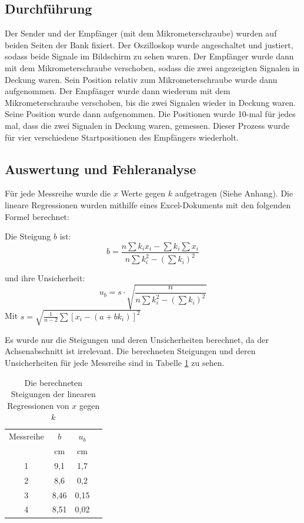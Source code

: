 \documentclass[11pt,a4paper]{article}
\begin{document}
\subsection{Durchführung}
Der Sender und der Empfänger (mit dem Mikrometerschraube) wurden auf beiden Seiten der Bank fixiert. Der Oszilloskop wurde angeschaltet und justiert, sodass beide Signale im Bildschirm zu sehen waren. Der Empfänger wurde dann mit dem Mikrometerschraube verschoben, sodass die zwei angezeigten Signalen in Deckung waren. Sein Position relativ zum Mikrometerschraube wurde dann aufgenommen. Der Empfänger wurde dann wiederum mit dem Mikrometerschraube verschoben, bis die zwei Signalen wieder in Deckung waren. Seine Position wurde dann aufgenommen. Die Positionen wurde 10-mal für jedes mal, dass die zwei Signalen in Deckung waren, gemessen. Dieser Prozess wurde für vier verschiedene Startpositionen des Empfängers wiederholt. 



\subsection{Auswertung und Fehleranalyse}
Für jede Messreihe wurde die $x$ Werte gegen $k$ aufgetragen (Siehe Anhang). Die lineare Regressionen wurden mithilfe eines Excel-Dokuments mit den folgenden Formel berechnet: 

Die Steigung $b$ ist:
$$ b = \frac{
	n\sum k_ix_i-\sum k_i \sum x_i
}{
	n \sum k_i^2 - (\sum k_i)^2
}$$

und ihre Unsicherheit:
$$u_b = s\cdot \sqrt{
	\frac{
		n
	}{
		n\sum k_i^2 - (\sum k_i)^2
}}$$
Mit 
$s = \sqrt{
	\frac{1}{n-2}\sum [x_i-(a+bk_i)]^2}$

Es wurde nur die Steigungen und deren Unsicherheiten berechnet, da der Achsenabschnitt ist irrelevant. Die berechneten Steigungen und deren Unsicherheiten für jede Messreihe sind in Tabelle \ref{Table1} zu sehen. 


\begin{table}[h]
	\centering
	\begin{tabular*}{0.50\textwidth}{@{\extracolsep{\fill}}cccc}
		\toprule
		Messreihe & $b$ & $u_b$ \\
		& cm & cm\\
		1 & 9,1 & 1,7 \\
		2 & 8,6 & 0,2 \\
		3 & 8,46 & 0,15 \\
		4 & 8,51 & 0,02 \\
		\bottomrule
	\end{tabular*}
\caption{Die berechneten Steigungen der linearen Regressionen von $x$ gegen $k$}
\label{Table1}
\end{table}
\end{document}
